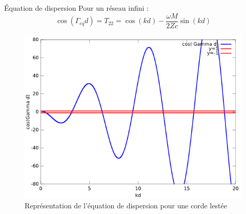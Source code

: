 \documentclass[xcolor=x11names,compress]{beamer}
\renewcommand{\(}{\begin{columns}}
\renewcommand{\)}{\end{columns}}
\newcommand{\<}[1]{\begin{column}{#1}}
\renewcommand{\>}{\end{column}}
\begin{document}
\begin{frame}{Équation de dispersion}
Pour un réseau infini :
\begin{equation}
	\cos(\Gamma_{eq} d) = T_{22} = \cos(kd) - \frac{\omega M}{2 Zc}\sin(kd)
\end{equation}

\begin{figure}
\includegraphics[scale = 0.4]{./figures/ex_disp_cordeleste.png}
\caption*{\scriptsize Représentation de l'équation de dispersion pour une corde lestée }
\end{figure}
\end{frame}

\end{document}
